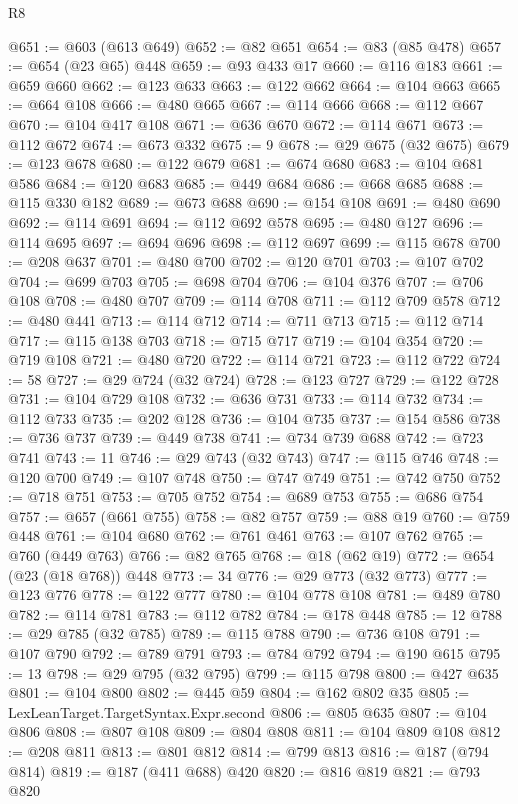 \begin{lexlean}{R8}
\begin{coremodule}
@651 := @603 (@613 @649)
@652 := @82 @651
@654 := @83 (@85 @478)
@657 := @654 (@23 @65) @448
@659 := @93 @433 @17
@660 := @116 @183
@661 := @659 @660
@662 := @123 @633
@663 := @122 @662
@664 := @104 @663
@665 := @664 @108
@666 := @480 @665
@667 := @114 @666
@668 := @112 @667
@670 := @104 @417 @108
@671 := @636 @670
@672 := @114 @671
@673 := @112 @672
@674 := @673 @332
@675 := 9
@678 := @29 @675 (@32 @675)
@679 := @123 @678
@680 := @122 @679
@681 := @674 @680
@683 := @104 @681 @586
@684 := @120 @683
@685 := @449 @684
@686 := @668 @685
@688 := @115 @330 @182
@689 := @673 @688
@690 := @154 @108
@691 := @480 @690
@692 := @114 @691
@694 := @112 @692 @578
@695 := @480 @127
@696 := @114 @695
@697 := @694 @696
@698 := @112 @697
@699 := @115 @678
@700 := @208 @637
@701 := @480 @700
@702 := @120 @701
@703 := @107 @702
@704 := @699 @703
@705 := @698 @704
@706 := @104 @376
@707 := @706 @108
@708 := @480 @707
@709 := @114 @708
@711 := @112 @709 @578
@712 := @480 @441
@713 := @114 @712
@714 := @711 @713
@715 := @112 @714
@717 := @115 @138 @703
@718 := @715 @717
@719 := @104 @354
@720 := @719 @108
@721 := @480 @720
@722 := @114 @721
@723 := @112 @722
@724 := 58
@727 := @29 @724 (@32 @724)
@728 := @123 @727
@729 := @122 @728
@731 := @104 @729 @108
@732 := @636 @731
@733 := @114 @732
@734 := @112 @733
@735 := @202 @128
@736 := @104 @735
@737 := @154 @586
@738 := @736 @737
@739 := @449 @738
@741 := @734 @739 @688
@742 := @723 @741
@743 := 11
@746 := @29 @743 (@32 @743)
@747 := @115 @746
@748 := @120 @700
@749 := @107 @748
@750 := @747 @749
@751 := @742 @750
@752 := @718 @751
@753 := @705 @752
@754 := @689 @753
@755 := @686 @754
@757 := @657 (@661 @755)
@758 := @82 @757
@759 := @88 @19
@760 := @759 @448
@761 := @104 @680
@762 := @761 @461
@763 := @107 @762
@765 := @760 (@449 @763)
@766 := @82 @765
@768 := @18 (@62 @19)
@772 := @654 (@23 (@18 @768)) @448
@773 := 34
@776 := @29 @773 (@32 @773)
@777 := @123 @776
@778 := @122 @777
@780 := @104 @778 @108
@781 := @489 @780
@782 := @114 @781
@783 := @112 @782
@784 := @178 @448
@785 := 12
@788 := @29 @785 (@32 @785)
@789 := @115 @788
@790 := @736 @108
@791 := @107 @790
@792 := @789 @791
@793 := @784 @792
@794 := @190 @615
@795 := 13
@798 := @29 @795 (@32 @795)
@799 := @115 @798
@800 := @427 @635
@801 := @104 @800
@802 := @445 @59
@804 := @162 @802 @35
@805 := LexLeanTarget.TargetSyntax.Expr.second
@806 := @805 @635
@807 := @104 @806
@808 := @807 @108
@809 := @804 @808
@811 := @104 @809 @108
@812 := @208 @811
@813 := @801 @812
@814 := @799 @813
@816 := @187 (@794 @814)
@819 := @187 (@411 @688) @420
@820 := @816 @819
@821 := @793 @820

\end{coremodule}
\end{lexlean}
